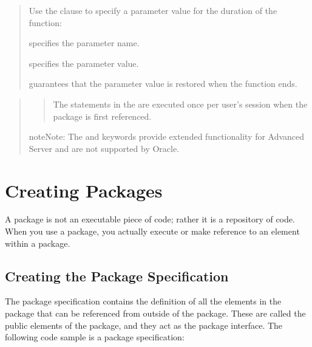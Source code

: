 \documentclass[letterpaper,10pt,english,openany,oneside]{sphinxmanual}
\begin{document}
\begin{quote}

Use the  clause to specify a parameter value for the duration of
the function:

 specifies the parameter name.

 specifies the parameter value.

 guarantees that the parameter value is restored when
the function ends.
\end{quote}

\newpage

\begin{quote}
\begin{quote}

The statements in the  are executed once per
user’s session when the package is first referenced.
\end{quote}

\begin{sphinxadmonition}{note}{Note:}
The  and  keywords provide extended functionality for Advanced Server and are not supported by Oracle.
\end{sphinxadmonition}
\end{quote}

\newpage


\section{Creating Packages}
\label{\detokenize{creating_packages::doc}}\label{\detokenize{creating_packages:creating-packages}}
A package is not an executable piece of code; rather it is a repository
of code. When you use a package, you actually execute or make reference
to an element within a package.


\subsection{Creating the Package Specification}
\label{\detokenize{creating_packages:creating-the-package-specification}}
The package specification contains the definition of all the elements in
the package that can be referenced from outside of the package. These
are called the public elements of the package, and they act as the
package interface. The following code sample is a package specification:
\end{document}

